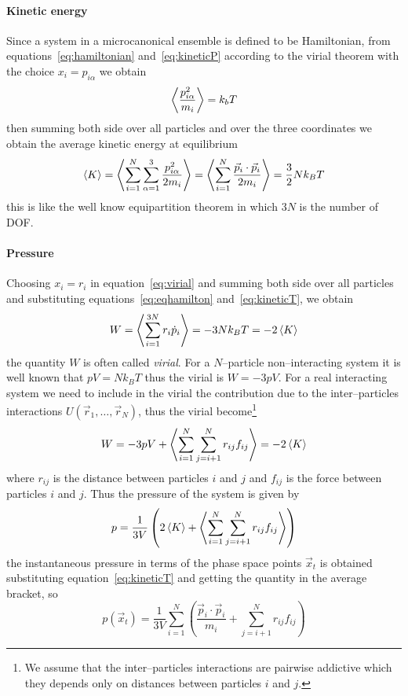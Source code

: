 \paragraph{\textbf{Kinetic energy}} Since a system in a microcanonical ensemble is defined to be Hamiltonian, from equations~\eqref{eq:hamiltonian} and~\eqref{eq:kineticP} according to the virial theorem with the choice $x_i = p_{i\alpha}$ we obtain
\begin{equation*}
	\left \langle \frac{p^2_{i\alpha}}{m_i} \right \rangle = k_bT
\end{equation*}
then summing both side over all particles and over the three coordinates we obtain the average kinetic energy at equilibrium
\begin{equation}
	\left \langle K \right \rangle = \left \langle  \sum_{i=1}^{N}\sum_{\alpha=1}^{3}\frac{p_{i\alpha}^2}{2m_i}  \right \rangle = \left \langle \sum_{i=1}^{N}\frac{\vec p_i\cdot \vec p_i}{2m_i} \right \rangle = \frac{3}{2}Nk_B T
	\label{eq:kineticT}
\end{equation}
this is like the well know equipartition theorem in which $3N$ is the number of \ac{DOF}.

\paragraph{\textbf{Pressure}} Choosing $x_i = r_i$ in equation~\eqref{eq:virial} and summing both side over all particles and substituting equations~\eqref{eq:eqhamilton} and~\eqref{eq:kineticT}, we obtain
\begin{equation*}
	W = \left \langle \sum_{i=1}^{3N} r_i\dot p_i \right \rangle = -3Nk_B T = - 2 \left \langle K \right \rangle
\end{equation*}
the quantity $W$ is often called \textit{virial}. For a $N$--particle non--interacting system it is well known that $pV = Nk_B T$ thus the virial is $W = -3pV$. For a real interacting system we need to include in the virial the contribution due to the inter--particles interactions $U(\vec r_1,\dots,\vec r_N)$, thus the virial become\footnote{We assume that the inter--particles interactions are pairwise addictive which they depends only on distances between particles $i$ and $j$.}
\begin{equation*}
	W = -3pV + \left \langle  \sum_{i=1}^N\sum_{j=i+1}^Nr_{ij}f_{ij}  \right \rangle = - 2 \left \langle K \right \rangle
\end{equation*}
where $r_{ij}$ is the distance between particles $i$ and $j$ and $f_{ij}$ is the force between particles $i$ and $j$. Thus the pressure of the system is given by
\begin{equation*}
	p = \frac{1}{3V}\left (2 \left \langle K \right \rangle + \left \langle  \sum_{i=1}^N\sum_{j=i+1}^Nr_{ij}f_{ij}  \right \rangle \right )	
\end{equation*}
the instantaneous pressure in terms of the phase space points $\vec x_t$ is obtained substituting equation~\eqref{eq:kineticT} and getting the quantity in the average bracket, so
\begin{equation}
	p(\vec x_t) = \frac{1}{3V} \sum_{i=1}^{N} \left ( \frac{\vec p_i \cdot \vec p_i}{m_i} +  \sum_{j=i+1}^Nr_{ij}f_{ij}  \right )
	\label{eq:pressure}
\end{equation}


